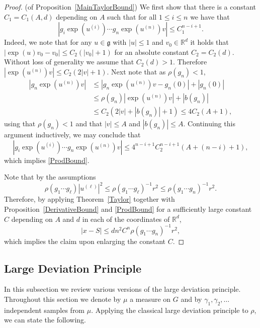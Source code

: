 \documentclass[10pt, english,oneside,reqno]{amsart}
\theoremstyle{plain}
\theoremstyle{remark}
\numberwithin{equation}{section}
\numberwithin{figure}{section}
\newcommand{\R}{\mathbb{R}}
\begin{document}
\begin{proof}(of Proposition~\ref{MainTaylorBound})
    We first show that there is a constant $C_1 = C_1(A,d)$ depending on $A$ such that for all $1 \leq i \leq n$ we have that 
    \begin{equation}\label{ProdBound}
        |g_i\exp(u^{(i)})\cdots g_n\exp(u^{(n)})v| \leq C_1^{n-i + 1}.
    \end{equation}
    Indeed, we note that for any $u \in \mathfrak{g}$ with $|u| \leq 1$ and $v_0 \in \R^d$ it holds that $|\exp(u)v_0 - v_0| \leq C_2(|v_0| + 1)$ for an absolute constant $C_2 = C_2(d)$. Without loss of generality we assume that $C_2(d) > 1$. Therefore $|\exp(u^{(n)})v| \leq C_2 (2|v| + 1)$. Next note that as $\rho(g_n) < 1$, 
    \begin{align*}
        |g_n\exp(u^{(n)})v| &\leq |g_n\exp(u^{(n)})v - g_n(0)| + |g_n(0)| \\ &\leq \rho(g_n)|\exp(u^{(n)})v| + |b(g_n)| \\   & \leq C_2(2|v| + |b(g_n)| + 1)  \leq 4C_2(A + 1),
    \end{align*} using that $\rho(g_n) < 1$ and that $|v| \leq A$ and $|b(g_n)| \leq A$. Continuing this argument inductively, we may conclude that $$|g_i\exp(u^{(i)})\cdots g_n\exp(u^{(n)})v| \leq 4^{n-i + 1}C_2^{n-i + 1}(A + (n-i) + 1),$$ which implies \eqref{ProdBound}.
    
	Note that by the assumptions $$\rho(g_1\cdots g_{\ell}) |u^{(\ell)}|^2 \leq \rho(g_1\cdots g_{\ell})^{-1}r^2 \leq \rho(g_1\cdots g_n)^{-1}r^2.$$ Therefore, by applying Theorem~\ref{Taylor} together with Proposition~\ref{DerivativeBound} and \eqref{ProdBound} for a sufficiently large constant $C$ depending on $A$ and $d$ in each of the coordinates of $\R^d$, $$|x - S| \leq dn^2C^n \rho(g_1\cdots g_n)^{-1} r^2,$$ which implies the claim upon enlarging the constant $C$.
\end{proof}




\subsection{Large Deviation Principle} \label{subsection:LDP}

In this subsection we review various versions of the large deviation principle. Throughout this section we denote by $\mu$ a measure on $G$ and by $\gamma_1, \gamma_2, \ldots$ independent samples from $\mu$. Applying the classical large deviation principle to $\rho$, we can state the following.
\end{document}
